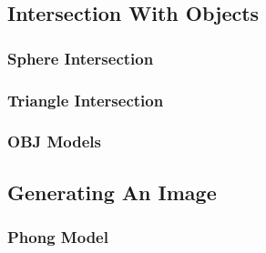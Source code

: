 \documentclass[final]{cmpreport}
\begin{document}
\subsection{Intersection With Objects}

\subsubsection{Sphere Intersection}

\subsubsection{Triangle Intersection}

\subsubsection{OBJ Models}

\subsection{Generating An Image}

\subsubsection{Phong Model}
\end{document}
